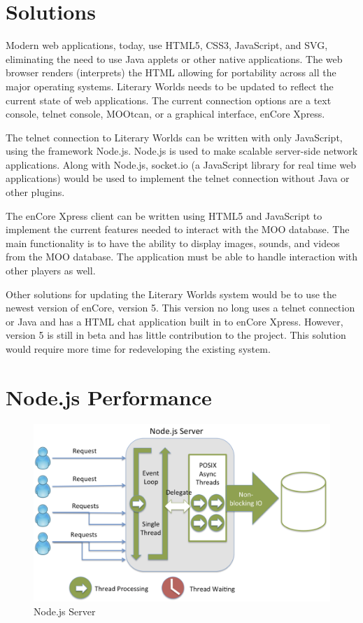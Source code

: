 \documentclass[12pt, letterpaper]{report}
\begin{document}
\section{Solutions}
Modern web applications, today, use HTML5, CSS3, JavaScript, and SVG, eliminating the need to use Java applets or other native applications. The web browser renders (interprets) the HTML allowing for portability across all the major operating systems. Literary Worlds needs to be updated to reflect the current state of web applications. The current connection options are a text console, telnet console, MOOtcan, or a graphical interface, enCore Xpress. 

\par
The telnet connection to Literary Worlds can be written with only JavaScript, using the framework Node.js.  Node.js is used to make scalable server-side network applications. Along with Node.js, socket.io (a JavaScript library for real time web applications) would be used to implement the telnet connection without Java or other plugins.

\par
The enCore Xpress client can be written using HTML5 and JavaScript to implement the current features needed to interact with the MOO database. The main functionality is to have the ability to display images, sounds, and videos from the MOO database.  The application must be able to handle interaction with other players as well.

\par
Other solutions for updating the Literary Worlds system would be to use the newest version of enCore, version 5.  This version no long uses a telnet connection or Java and has a HTML chat application built in to enCore Xpress.  However, version 5 is still in beta and has little contribution to the project.  This solution would require more time for redeveloping the existing system.

\section{Node.js Performance}
\begin{figure}[htp]
\centering
\includegraphics[scale=0.3]{threading_node.png}
\caption{Node.js Server \cite{fullStackJS}}
\label{node1}
\end{figure}
\end{document}
